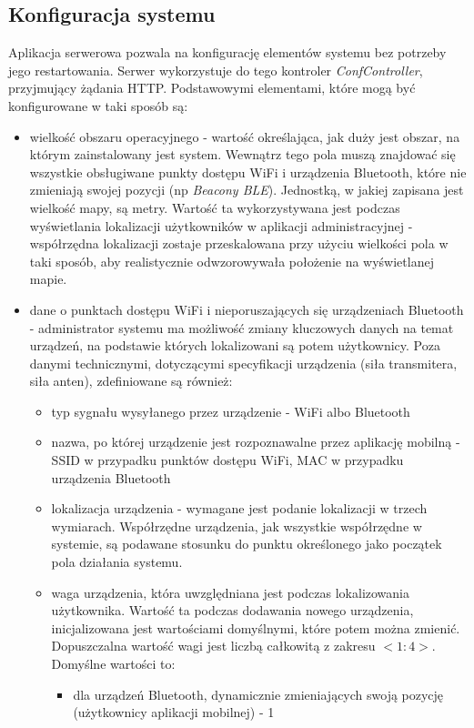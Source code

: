 \subsection{Konfiguracja systemu}
Aplikacja serwerowa pozwala na konfigurację elementów systemu bez potrzeby jego restartowania. Serwer wykorzystuje do tego kontroler \textit{ConfController}, przyjmujący żądania HTTP. Podstawowymi elementami, które mogą być konfigurowane w taki sposób są:
\begin{itemize}
	\item wielkość obszaru operacyjnego - wartość określająca, jak duży jest obszar, na którym zainstalowany jest system. Wewnątrz tego pola muszą znajdować się wszystkie obsługiwane punkty dostępu WiFi i urządzenia Bluetooth, które nie zmieniają swojej pozycji (np \textit{Beacony BLE}). Jednostką, w jakiej zapisana jest wielkość mapy, są metry. Wartość ta wykorzystywana jest podczas wyświetlania lokalizacji użytkowników w aplikacji administracyjnej - współrzędna lokalizacji zostaje przeskalowana przy użyciu wielkości pola w taki sposób, aby realistycznie odwzorowywała położenie na wyświetlanej mapie.
	\item dane o punktach dostępu WiFi i nieporuszających się urządzeniach Bluetooth - administrator systemu ma możliwość zmiany kluczowych danych na temat urządzeń, na podstawie których lokalizowani są potem użytkownicy. Poza danymi technicznymi, dotyczącymi specyfikacji urządzenia (siła transmitera, siła anten), zdefiniowane są również:
	\begin{itemize}
		\item typ sygnału wysyłanego przez urządzenie - WiFi albo Bluetooth
		\item nazwa, po której urządzenie jest rozpoznawalne przez aplikację mobilną - SSID w przypadku punktów dostępu WiFi, MAC w przypadku urządzenia Bluetooth
		\item lokalizacja urządzenia - wymagane jest podanie lokalizacji w trzech wymiarach. Współrzędne urządzenia, jak wszystkie współrzędne w systemie, są podawane stosunku do punktu określonego jako początek pola działania systemu.
		\item waga urządzenia, która uwzględniana jest podczas lokalizowania użytkownika. Wartość ta podczas dodawania nowego urządzenia, inicjalizowana jest wartościami domyślnymi, które potem można zmienić. Dopuszczalna wartość wagi jest liczbą całkowitą z zakresu $<1:4>$. Domyślne wartości to:
		\begin{itemize}
			\item dla urządzeń Bluetooth, dynamicznie zmieniających swoją pozycję (użytkownicy aplikacji mobilnej) - 1

\end{itemize}
\end{itemize}
\end{itemize}
